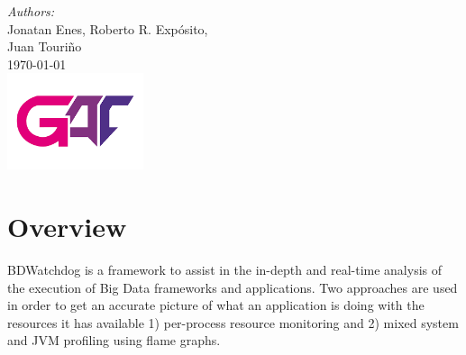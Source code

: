 \documentclass[12pt]{article}
\begin{document}
\begin{titlepage}
		\Large \emph{Authors:}\\
		Jonatan Enes, Roberto R. Expósito, \\ Juan Touriño \\[1cm] %
		
		
		{\large \today}\\[1cm] %
		
		
		\includegraphics[width=0.3\textwidth]{gac_logo.png}\\[1cm] %
		
		
		\vfill %
		
	\end{titlepage}




%

\section{Overview}

BDWatchdog is a framework to assist in the in-depth and real-time analysis of the execution of Big Data frameworks and applications. Two approaches are used in order to get an accurate picture of what an application is doing with the resources it has available 1) per-process resource monitoring and 2) mixed system and JVM profiling using flame graphs.
\end{document}
